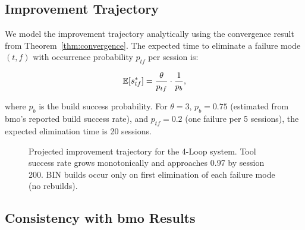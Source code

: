 \subsection{Improvement Trajectory}

We model the improvement trajectory analytically using the convergence
result from Theorem~\ref{thm:convergence}. The expected time to eliminate
a failure mode $(t,f)$ with occurrence probability $p_{tf}$ per session is:

\begin{equation}
\operatorname{\mathbb{E}}[s^*_{tf}] = \frac{\theta}{p_{tf}} \cdot \frac{1}{p_b},
\end{equation}

where $p_b$ is the build success probability. For $\theta=3$, $p_b=0.75$
(estimated from bmo's reported build success rate), and $p_{tf}=0.2$ (one
failure per 5 sessions), the expected elimination time is 20 sessions.

\begin{figure}[H]
\centering
{}
\caption{Projected improvement trajectory for the 4-Loop system.
Tool success rate grows monotonically and approaches 0.97 by session 200.
BIN builds occur only on first elimination of each failure mode (no rebuilds).}
\label{fig:trajectory}
\end{figure}

\subsection{Consistency with bmo Results}

